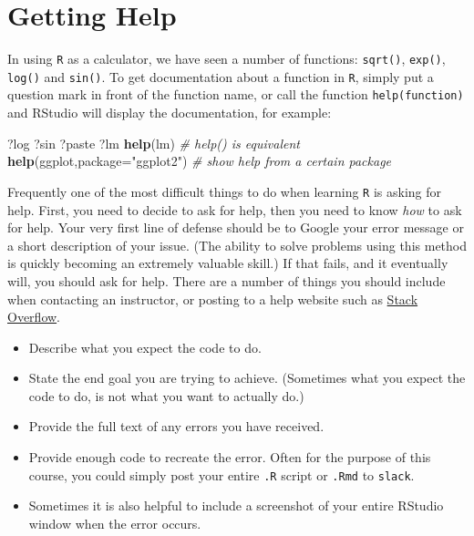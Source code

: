 \documentclass[]{book}
\newenvironment{Shaded}{\begin{snugshade}}{\end{snugshade}}
\newcommand{\CommentTok}[1]{\textcolor[rgb]{0.56,0.35,0.01}{\textit{#1}}}
\newcommand{\DataTypeTok}[1]{\textcolor[rgb]{0.13,0.29,0.53}{#1}}
\newcommand{\KeywordTok}[1]{\textcolor[rgb]{0.13,0.29,0.53}{\textbf{#1}}}
\newcommand{\NormalTok}[1]{#1}
\newcommand{\StringTok}[1]{\textcolor[rgb]{0.31,0.60,0.02}{#1}}
\providecommand{\tightlist}{%
  \setlength{\itemsep}{0pt}\setlength{\parskip}{0pt}}
\begin{document}
\hypertarget{getting-help}{%
\section{Getting Help}\label{getting-help}}

In using \texttt{R} as a calculator, we have seen a number of functions: \texttt{sqrt()}, \texttt{exp()}, \texttt{log()} and \texttt{sin()}. To get documentation about a function in \texttt{R}, simply put a question mark in front of the function name, or call the function \texttt{help(function)} and RStudio will display the documentation, for example:

\begin{Shaded}
\begin{Highlighting}[]
\NormalTok{?log}
\NormalTok{?sin}
\NormalTok{?paste}
\NormalTok{?lm}
\KeywordTok{help}\NormalTok{(lm)   }\CommentTok{# help() is equivalent}
\KeywordTok{help}\NormalTok{(ggplot,}\DataTypeTok{package=}\StringTok{"ggplot2"}\NormalTok{)  }\CommentTok{# show help from a certain package}
\end{Highlighting}
\end{Shaded}

Frequently one of the most difficult things to do when learning \texttt{R} is asking for help. First, you need to decide to ask for help, then you need to know \emph{how} to ask for help. Your very first line of defense should be to Google your error message or a short description of your issue. (The ability to solve problems using this method is quickly becoming an extremely valuable skill.) If that fails, and it eventually will, you should ask for help. There are a number of things you should include when contacting an instructor, or posting to a help website such as \href{https://stackoverflow.com}{Stack Overflow}.

\begin{itemize}
\tightlist
\item
  Describe what you expect the code to do.
\item
  State the end goal you are trying to achieve. (Sometimes what you expect the code to do, is not what you want to actually do.)
\item
  Provide the full text of any errors you have received.
\item
  Provide enough code to recreate the error. Often for the purpose of this course, you could simply post your entire \texttt{.R} script or \texttt{.Rmd} to \texttt{slack}.
\item
  Sometimes it is also helpful to include a screenshot of your entire RStudio window when the error occurs.
\end{itemize}
\end{document}
